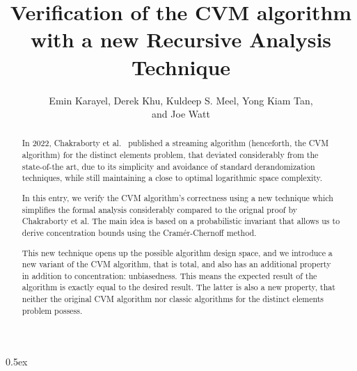 \documentclass[11pt,a4paper]{article}
\theoremstyle{definition}
\begin{document}
\title{Verification of the CVM algorithm with a new Recursive Analysis Technique}
\author{Emin Karayel, Derek Khu, Kuldeep S. Meel, Yong Kiam Tan,\\and Joe Watt}
\maketitle

\begin{abstract}
In 2022, Chakraborty et al.~\cite{chakraborty2022} published a streaming 
algorithm (henceforth, the CVM algorithm) for the distinct
elements problem, that deviated considerably from the state-of-the art, due to its simplicity
and avoidance of standard derandomization techniques, while still maintaining a close to optimal
logarithmic space complexity.

In this entry, we verify the CVM algorithm's correctness using a new technique which simplifies
the formal analysis considerably compared to the orignal proof by Chakraborty et
al. The main idea is based on a probabilistic invariant that allows us to derive concentration bounds
using the Cram\'{e}r-Chernoff method.

This new technique opens up the possible algorithm design space, and we introduce a new variant of the 
CVM algorithm, that is total, and also has an additional property in addition 
to concentration: unbiasedness. This means the expected result of the algorithm is exactly equal to
the desired result. The latter is also a new property, that neither the original CVM algorithm
nor classic algorithms for the distinct elements problem possess.
\end{abstract}

\tableofcontents

\parindent 0pt\parskip 0.5ex






\appendix

\end{document}

